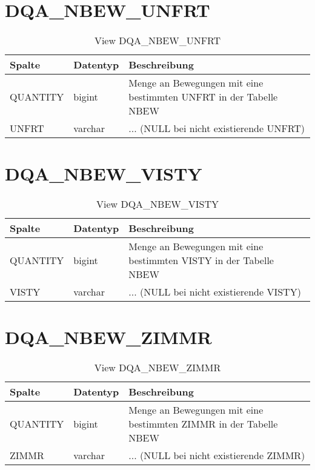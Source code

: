   \section{DQA\_NBEW\_UNFRT}

  \begin{table}[ht]
    \centering
    \caption{View DQA\_NBEW\_UNFRT}
    \label{tab:dqanbewunfrt}
    \begin{tabular}{||l|l|p{10cm}||}
      \hline
      Spalte & Datentyp & Beschreibung \\ [0.5ex] \hline \hline
QUANTITY & bigint & Menge an Bewegungen mit eine bestimmten UNFRT in der Tabelle NBEW \\ \hline
UNFRT & varchar & ... (NULL bei nicht existierende UNFRT)\\ \hline
    \end{tabular}
  \end{table}
 \clearpage
  \section{DQA\_NBEW\_VISTY}

  \begin{table}[ht]
    \centering
    \caption{View DQA\_NBEW\_VISTY}
    \label{tab:dqanbewvisty}
    \begin{tabular}{||l|l|p{10cm}||}
      \hline
      Spalte & Datentyp & Beschreibung \\ [0.5ex] \hline \hline
QUANTITY & bigint & Menge an Bewegungen mit eine bestimmten VISTY in der Tabelle NBEW \\ \hline
VISTY & varchar & ... (NULL bei nicht existierende VISTY)\\ \hline
    \end{tabular}
  \end{table}
 \clearpage
  \section{DQA\_NBEW\_ZIMMR}

  \begin{table}[ht]
    \centering
    \caption{View DQA\_NBEW\_ZIMMR}
    \label{tab:dqanbewzimmr}
    \begin{tabular}{||l|l|p{10cm}||}
      \hline
      Spalte & Datentyp & Beschreibung \\ [0.5ex] \hline \hline
QUANTITY & bigint & Menge an Bewegungen mit eine bestimmten ZIMMR in der Tabelle NBEW \\ \hline
ZIMMR & varchar & ... (NULL bei nicht existierende ZIMMR)\\ \hline
    \end{tabular}
  \end{table}
 \clearpage
